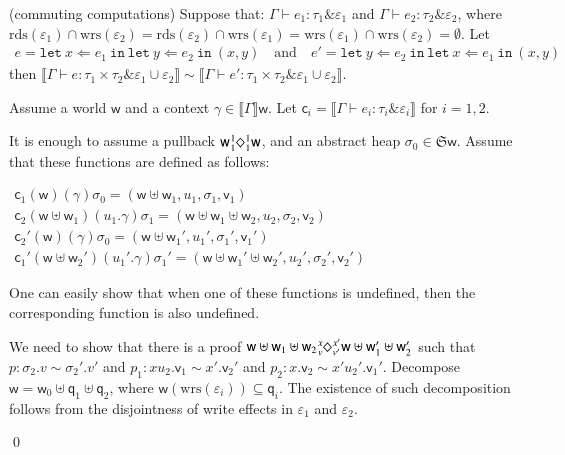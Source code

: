 \documentclass[orivec]{llncs}
\newcommand{\keywd}[1]{\mathtt{#1}}
\newcommand{\sq}[4]{\tensor*[^{#1}_{#2}]{\Diamond}{^{#3}_{#4}}}
\newcommand{\letin}[2]{\keywd{let}\:{#1}\!\Leftarrow\!{#2}\:\keywd{in}\:}
\newcommand{\rdsin}[1]{\mathrm{rds}({#1})}
\newcommand{\wrsin}[1]{\mathrm{wrs}({#1})}
\newcommand{\eff}{\varepsilon}
\newcommand{\sem}[1]{\ensuremath{\llbracket {#1} \rrbracket}}
\renewenvironment{proof}{\vspace{-1mm} \noindent {\bf Proof}\quad}{\qed}
\newcommand\w{\ensuremath{\mathsf{w}}\xspace}
\newcommand\q{\ensuremath{\mathsf{q}}\xspace}
\newcommand{\Astores}{\mathfrak{S}}
\newcommand\val{\ensuremath{\mathsf{v}}\xspace}
\newcommand\cval{\ensuremath{\mathsf{c}}\xspace}
\newcommand{\ety}[2]{{#1}\mathrel{\&}{#2}}
\begin{document}
\begin{proposition}\label{compr}
(commuting computations) Suppose that:
$
 \Gamma \vdash e_1 : \ety{\tau_1}{\eff_1}$ and
$\Gamma \vdash e_2 :
\ety{\tau_2}{\eff_2}
$,
where  $\rdsin{\eff_1} \cap \wrsin{\eff_2} = \rdsin{\eff_2} \cap
\wrsin{\eff_1}= 
\wrsin{\eff_1} \cap \wrsin{\eff_2} = \emptyset$. Let 
\[
 \begin{array}{l}
  e = \letin{x}{e_1} \letin{y}{e_2} (x, y) \quad \textrm{and} \quad
  e' = \letin{y}{e_2} \letin{x}{e_1} (x, y)
 \end{array}
\]
then $\sem{\Gamma \vdash e : \ety{ \tau_1 \times \tau_2 }{\eff_1\cup
\eff_2}} \sim \sem{\Gamma \vdash e' : \ety{ \tau_1 \times \tau_2
}{\eff_1\cup \eff_2}}$.
\end{proposition}

\begin{proof}
Assume a world \w and a context $\gamma \in \sem{\Gamma}\w$.
Let $\cval_i = \sem{\Gamma \vdash e_i : \ety{\tau_i}{\eff_i}}$ for
$i = 1,2$. 

It is enough to assume a pullback 
$\w \sq{1}{1}{1}{1} \w$, and an abstract heap $\sigma_0 \in
\Astores \w$. 
Assume that these functions are defined as follows:

\(
 \begin{array}{l}
 \cval_1(\w)(\gamma)\sigma_0 = (\w \uplus \w_1, u_1, \sigma_1, \val_1)\\
 \cval_2(\w\uplus\w_1)(u_1.\gamma) \sigma_1 = (\w \uplus \w_1 \uplus
\w_2, u_2, \sigma_2, \val_2)\\
 \cval_2'(\w)(\gamma)\sigma_0 = (\w \uplus \w_1', u_1', \sigma_1',
\val_1')\\
 \cval_1'(\w\uplus\w_2')(u_1'.\gamma) \sigma_1' = (\w \uplus \w_1'
\uplus \w_2', u_2', \sigma_2',\val_2')
 \end{array}
\)

\noindent
One can easily show that when one of these functions is undefined, then 
the corresponding function is also undefined. 

We need to show that there is a proof $\w \uplus \w_1 \uplus \w_2
\sq{x}{v}{x'}{v'} \w \uplus \w_1' \uplus \w_2'$ such that
$p : \sigma_2.v \sim \sigma_2'.v'$ and $p_1 : xu_2.\val_1 \sim x'.\val_2'$
and $p_2 : x.\val_2 \sim x'u_2'.\val_1'$.
Decompose $\w = \w_0 \uplus \q_1 \uplus \q_2$, where
$\w(\wrsin{\eff_i}) \subseteq \q_i$. 
The existence of such decomposition follows from the disjointness of write
effects in $\eff_1$ and $\eff_2$.


\end{proof}
\end{document}
